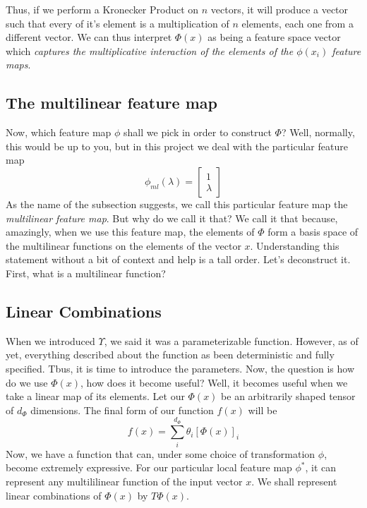 \documentclass{article}
\theoremstyle{definition}
\theoremstyle{definition}
\begin{document}
Thus, if we perform a Kronecker Product on $n$ vectors, it will produce a vector such that every of it's element is a multiplication of $n$ elements, each one from a different vector. We can thus interpret $\Phi(x)$ as being a feature space vector which \emph{captures the multiplicative interaction of the elements of the $\phi(x_i)$ feature maps}.



\subsection{The multilinear feature map}
Now, which feature map $\phi$ shall we pick in order to construct $\Phi$?
Well, normally, this would be up to you, but in this project we deal with the particular feature map
\begin{equation}
    \phi_{ml}(\lambda) = 
    \begin{bmatrix}
        1 \\
        \lambda
    \end{bmatrix}
\end{equation}
As the name of the subsection suggests, we call this particular feature map the \emph{multilinear feature map}.
But why do we call it that?
We call it that because, amazingly, when we use this feature map, the elements of $\Phi$ form a basis space of the multilinear functions on the elements of the vector $x$.
Understanding this statement without a bit of context and help is a tall order. Let's deconstruct it.
First, what is a multilinear function?


\subsection{Linear Combinations}
When we introduced $\Upsilon$, we said it was a parameterizable function.
However, as of yet, everything described about the function as been deterministic and fully specified.
Tbus, it is time to introduce the parameters. 
Now, the question is how do we use $\Phi(x)$, how does it become useful? 
Well, it becomes useful when we take a linear map of its elements. Let our $\Phi(x)$ be an 
arbitrarily shaped tensor of $d_{\Phi}$ dimensions. The final form of our 
function $f(x)$ will be
\begin{equation} \label{eq:model}
    f(x) = \sum_{i}^{d_{\Phi}} \theta_i [\Phi(x)]_i
\end{equation}
Now, we have a function that can, under some choice of transformation
$\phi$, become extremely expressive. For our particular local feature map 
$\phi^*$, it can represent any multililinear function  of the input vector $x$. 
We shall represent linear combinations of $\Phi(x)$ by $T\Phi(x)$.
\end{document}
